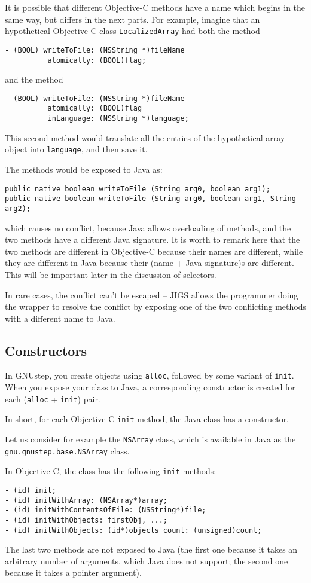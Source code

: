It is possible that different Objective-C methods have a name which
begins in the same way, but differs in the next parts.  For example,
imagine that an hypothetical Objective-C class \texttt{LocalizedArray}
had both the method 
\begin{verbatim}
- (BOOL) writeToFile: (NSString *)fileName  
          atomically: (BOOL)flag;
\end{verbatim}
and the method
\begin{verbatim}
- (BOOL) writeToFile: (NSString *)fileName  
          atomically: (BOOL)flag
          inLanguage: (NSString *)language;
\end{verbatim}
This second method would translate all the entries of the hypothetical
array object into \texttt{language}, and then save it.

The methods would be exposed to Java as:
\begin{verbatim} 
public native boolean writeToFile (String arg0, boolean arg1);
public native boolean writeToFile (String arg0, boolean arg1, String arg2);
\end{verbatim}
which causes no conflict, because Java allows overloading of methods,
and the two methods have a different Java signature.  It is worth to
remark here that the two methods are different in Objective-C because
their names are different, while they are different in Java because
their (name + Java signature)s are different.  This will be important
later in the discussion of selectors.

In rare cases, the conflict can't be escaped -- JIGS allows the
programmer doing the wrapper to resolve the conflict by exposing one
of the two conflicting methods with a different name to Java.

\subsection{Constructors}
In GNUstep, you create objects using \texttt{alloc}, followed by some
variant of \texttt{init}.  When you expose your class to Java, a
corresponding constructor is created for each
(\texttt{alloc} + \texttt{init}) pair.  

In short, for each Objective-C \texttt{init} method, the Java class
has a constructor.

Let us consider for example the \texttt{NSArray} class, which is
available in Java as the \texttt{gnu.gnustep.base.NSArray} class.

In Objective-C, the class has the following \texttt{init} methods:
\begin{verbatim}
- (id) init;
- (id) initWithArray: (NSArray*)array;
- (id) initWithContentsOfFile: (NSString*)file;
- (id) initWithObjects: firstObj, ...;
- (id) initWithObjects: (id*)objects count: (unsigned)count;
\end{verbatim}
The last two methods are not exposed to Java (the first one because it
takes an arbitrary number of arguments, which Java does not support;
the second one because it takes a pointer argument).

